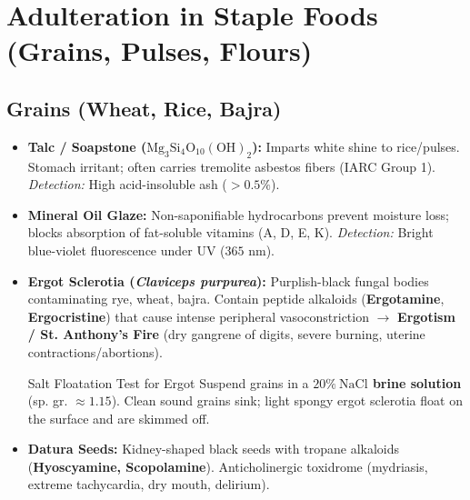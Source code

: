 \documentclass[10pt,a4paper,oneside]{article}
\begin{document}
\vspace{-0.2cm}

\section{Adulteration in Staple Foods (Grains, Pulses, Flours)}

\subsection{Grains (Wheat, Rice, Bajra)}
\begin{itemize}[leftmargin=*]
    \item \textbf{Talc / Soapstone ($\mathrm{Mg_3Si_4O_{10}(OH)_2}$):} Imparts white shine to rice/pulses. Stomach irritant; often carries tremolite asbestos fibers (IARC Group 1). \textit{Detection:} High acid-insoluble ash ($>0.5\%$).
    \item \textbf{Mineral Oil Glaze:} Non-saponifiable hydrocarbons prevent moisture loss; blocks absorption of fat-soluble vitamins (A, D, E, K). \textit{Detection:} Bright blue-violet fluorescence under UV ($365\text{ nm}$).
    \item \textbf{Ergot Sclerotia (\textit{Claviceps purpurea}):} Purplish-black fungal bodies contaminating rye, wheat, bajra. Contain peptide alkaloids (\textbf{Ergotamine}, \textbf{Ergocristine}) that cause intense peripheral vasoconstriction $\rightarrow$ \textbf{Ergotism / St. Anthony's Fire} (dry gangrene of digits, severe burning, uterine contractions/abortions).
    \begin{protocolbox}{Salt Floatation Test for Ergot}
    Suspend grains in a \textbf{$20\%\ \mathrm{NaCl}$ brine solution} (sp. gr. $\approx 1.15$). Clean sound grains sink; light spongy ergot sclerotia float on the surface and are skimmed off.
    \end{protocolbox}
    \item \textbf{Datura Seeds:} Kidney-shaped black seeds with tropane alkaloids (\textbf{Hyoscyamine, Scopolamine}). Anticholinergic toxidrome (mydriasis, extreme tachycardia, dry mouth, delirium).
\end{itemize}
\end{document}
